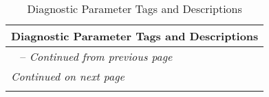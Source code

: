 \documentclass{article}
\begin{document}
{ %
\renewcommand{\arraystretch}{1.1} %

\begin{longtable}{|p{}|} %

\caption{Diagnostic Parameter Tags and Descriptions}%
\label{tab:diagnostic_tags}\\ %
\hline %
\textbf{Diagnostic Parameter Tags and Descriptions} \\ %
\hline %
\endfirsthead %

\hline %
\tablename\ \thetable{} -- \textit{Continued from previous page} \\ %
\hline %
\endhead %

\hline %
\textit{Continued on next page} \\ %
\endfoot %

\hline %
\endlastfoot %


\end{longtable}}
\end{document}
